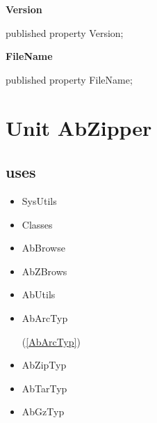 \documentclass{report}
\newif\ifpdf
\begin{document}
\begin{list}{}
\begin{flushleft}
\ifpdf
\end{flushleft}
\fi


\par  \label{AbUnzper.TAbUnZipper-Version}
\item[\textbf{Version}\hfill]
\ifpdf
\begin{flushleft}
\fi
\begin{ttfamily}
published property Version;\end{ttfamily}

\ifpdf
\end{flushleft}
\fi


\par  \label{AbUnzper.TAbUnZipper-FileName}
\item[\textbf{FileName}\hfill]
\ifpdf
\begin{flushleft}
\fi
\begin{ttfamily}
published property FileName;\end{ttfamily}

\ifpdf
\end{flushleft}
\fi


\par  \end{list}
\chapter{Unit AbZipper}
\label{AbZipper}
\section{uses}
\begin{itemize}
\item \begin{ttfamily}SysUtils\end{ttfamily}\item \begin{ttfamily}Classes\end{ttfamily}\item \begin{ttfamily}AbBrowse\end{ttfamily}\item \begin{ttfamily}AbZBrows\end{ttfamily}\item \begin{ttfamily}AbUtils\end{ttfamily}\item \begin{ttfamily}AbArcTyp\end{ttfamily}(\ref{AbArcTyp})\item \begin{ttfamily}AbZipTyp\end{ttfamily}\item \begin{ttfamily}AbTarTyp\end{ttfamily}\item \begin{ttfamily}AbGzTyp\end{ttfamily}\end{itemize}
\end{document}
